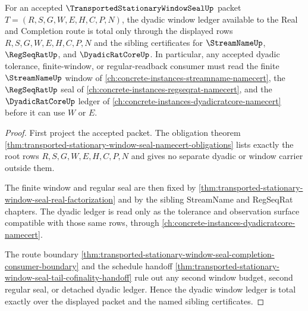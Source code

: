 \begin{theorem}
\label{thm:transported-stationary-window-seal-dyadic-window-ledger-totality}
For an accepted $\TransportedStationaryWindowSealUp$ packet $T=(R,S,G,W,E,H,C,P,N)$, the dyadic window ledger available to the Real and Completion route is total only through the displayed rows $R,S,G,W,E,H,C,P,N$ and the sibling certificates for $\StreamNameUp$, $\RegSeqRatUp$, and $\DyadicRatCoreUp$. In particular, any accepted dyadic tolerance, finite-window, or regular-readback consumer must read the finite $\StreamNameUp$ window of \autoref{ch:concrete-instances-streamname-namecert}, the $\RegSeqRatUp$ seal of \autoref{ch:concrete-instances-regseqrat-namecert}, and the $\DyadicRatCoreUp$ ledger of \autoref{ch:concrete-instances-dyadicratcore-namecert} before it can use $W$ or $E$.
\end{theorem}
\begin{proof}
First project the accepted packet. The obligation theorem \autoref{thm:transported-stationary-window-seal-namecert-obligations} lists exactly the root rows $R,S,G,W,E,H,C,P,N$ and gives no separate dyadic or window carrier outside them.

The finite window and regular seal are then fixed by \autoref{thm:transported-stationary-window-seal-real-factorization} and by the sibling StreamName and RegSeqRat chapters. The dyadic ledger is read only as the tolerance and observation surface compatible with those same rows, through \autoref{ch:concrete-instances-dyadicratcore-namecert}.

The route boundary \autoref{thm:transported-stationary-window-seal-completion-consumer-boundary} and the schedule handoff \autoref{thm:transported-stationary-window-seal-tail-cofinality-handoff} rule out any second window budget, second regular seal, or detached dyadic ledger. Hence the dyadic window ledger is total exactly over the displayed packet and the named sibling certificates.
\end{proof}

